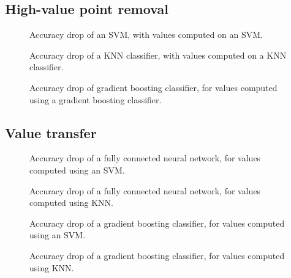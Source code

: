 \documentclass[10pt]{article}
\begin{document}
\subsection{High-value point removal}\label{app:high-value}

\begin{figure}[h]
  \caption{\label{fig:acc-svm-svm}Accuracy drop of an SVM, with values
  computed on an SVM.}
\end{figure}

\begin{figure}[h]
  \caption{\label{fig:acc-knn-knn}Accuracy drop of a KNN classifier, with
  values computed on a KNN classifier.}
\end{figure}

\begin{figure}[h]
  \caption{\label{fig:acc-mlp-mlp}Accuracy drop of gradient boosting
  classifier, for values computed using a gradient boosting classifier.}
\end{figure}

\subsection{Value transfer}\label{app:value-transfer}

\begin{figure}[h]
  \caption{\label{fig:transfer-svm-mlp}Accuracy drop of a fully connected
  neural network, for values computed using an SVM.}
\end{figure}

\begin{figure}[h]
  \caption{\label{fig:transfer-knn-mlp}Accuracy drop of a fully connected
  neural network, for values computed using KNN.}
\end{figure}

\begin{figure}[h]
  \caption{\label{fig:transfer-svm-gb}Accuracy drop of a gradient boosting
  classifier, for values computed using an SVM.}
\end{figure}

\begin{figure}[h]
  \caption{\label{fig:transfer-knn-gb}Accuracy drop of a gradient boosting
  classifier, for values computed using KNN.}
\end{figure}
\end{document}
